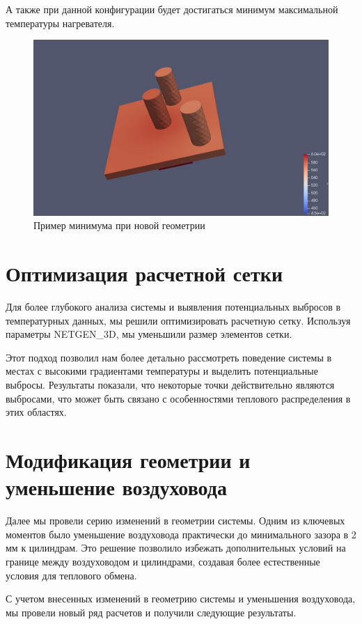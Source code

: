 \documentclass[a4paper,12pt]{article}
\theoremstyle{plain} %
\theoremstyle{definition} %
\theoremstyle{remark} %
\begin{document}
\newpage
А также при данной конфигурации будет достигаться минимум максимальной температуры нагревателя.

\begin{figure}[h]
	\begin{center}
		\includegraphics[width=0.4\linewidth]{21.5.jpg}
		\caption{Пример минимума при новой геометрии} %
	\end{center}
\end{figure}

\section{Оптимизация расчетной сетки}

Для более глубокого анализа системы и выявления потенциальных выбросов в температурных данных, мы решили оптимизировать расчетную сетку. Используя параметры NETGEN\_3D, мы уменьшили размер элементов сетки.

Этот подход позволил нам более детально рассмотреть поведение системы в местах с высокими градиентами температуры и выделить потенциальные выбросы. Результаты показали, что некоторые точки действительно являются выбросами, что может быть связано с особенностями теплового распределения в этих областях.

\section{Модификация геометрии и уменьшение воздуховода}

Далее мы провели серию изменений в геометрии системы. Одним из ключевых моментов было уменьшение воздуховода практически до минимального зазора в 2 мм к цилиндрам. Это решение позволило избежать дополнительных условий на границе между воздуховодом и цилиндрами, создавая более естественные условия для теплового обмена.

С учетом внесенных изменений в геометрию системы и уменьшения воздуховода, мы провели новый ряд расчетов и получили следующие результаты.
\end{document}
